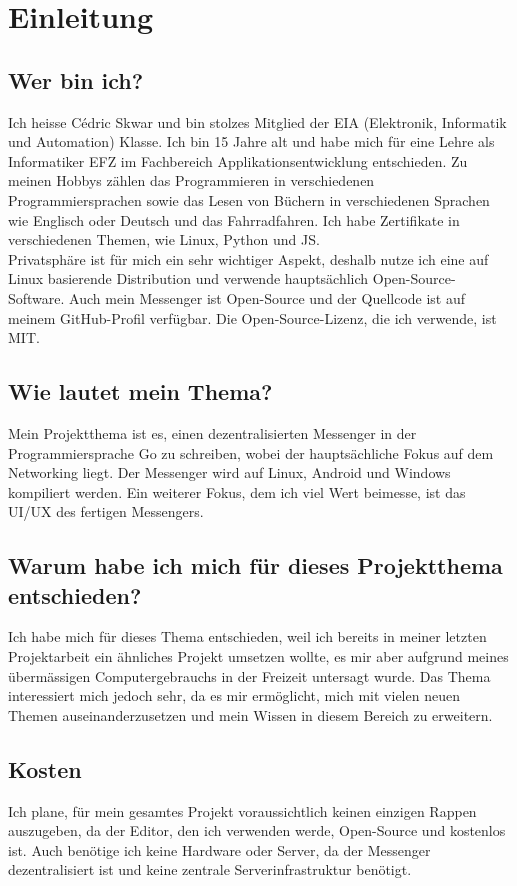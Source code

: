 \section{Einleitung}
\subsection{Wer bin ich?}
Ich heisse Cédric Skwar und bin stolzes Mitglied der EIA (Elektronik, Informatik und Automation) Klasse. Ich bin 15 Jahre alt und habe mich für eine Lehre als Informatiker EFZ im Fachbereich Applikationsentwicklung entschieden. Zu meinen Hobbys zählen das Programmieren in verschiedenen Programmiersprachen sowie das Lesen von Büchern in verschiedenen Sprachen wie Englisch oder Deutsch und das Fahrradfahren. 
Ich habe Zertifikate in verschiedenen Themen, wie Linux, Python und JS.\\
Privatsphäre ist für mich ein sehr wichtiger Aspekt, deshalb nutze ich eine auf Linux basierende Distribution und verwende hauptsächlich Open-Source-Software. Auch mein Messenger ist Open-Source und der Quellcode ist auf meinem GitHub-Profil verfügbar. Die Open-Source-Lizenz, die ich verwende, ist MIT.
\subsection{Wie lautet mein Thema?}
Mein Projektthema ist es, einen dezentralisierten Messenger in der Programmiersprache Go zu schreiben, wobei der hauptsächliche Fokus auf dem Networking liegt. Der Messenger wird auf Linux, Android und Windows kompiliert werden. Ein weiterer Fokus, dem ich viel Wert beimesse, ist das UI/UX des fertigen Messengers.
\subsection{Warum habe ich mich für dieses Projektthema entschieden?}
Ich habe mich für dieses Thema entschieden, weil ich bereits in meiner letzten Projektarbeit ein ähnliches Projekt umsetzen wollte, es mir aber aufgrund meines übermässigen Computergebrauchs in der Freizeit untersagt wurde. Das Thema interessiert mich jedoch sehr, da es mir ermöglicht, mich mit vielen neuen Themen auseinanderzusetzen und mein Wissen in diesem Bereich zu erweitern.
\subsection{Kosten}
Ich plane, für mein gesamtes Projekt voraussichtlich keinen einzigen Rappen auszugeben, da der Editor, den ich verwenden werde, Open-Source und kostenlos ist. Auch benötige ich keine Hardware oder Server, da der Messenger dezentralisiert ist und keine zentrale Serverinfrastruktur benötigt.
